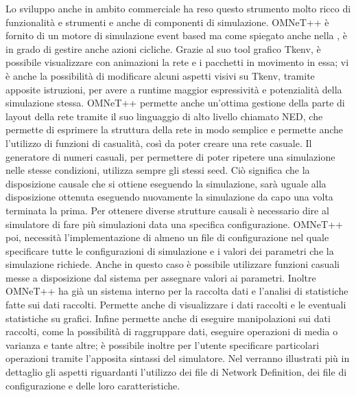 Lo sviluppo anche in ambito commerciale ha reso questo strumento molto ricco di funzionalità e strumenti e anche di componenti di simulazione. OMNeT++ è fornito di un motore di simulazione event based ma come spiegato anche nella , è in grado di gestire anche azioni cicliche. Grazie al suo tool grafico Tkenv, è possibile visualizzare con animazioni la rete e i pacchetti in movimento in essa; vi è anche la possibilità di modificare alcuni aspetti visivi su Tkenv, tramite apposite istruzioni, per avere a runtime maggior espressività e potenzialità della simulazione stessa. OMNeT++ permette anche un'ottima gestione della parte di layout della rete tramite il suo linguaggio di alto livello chiamato \acf{NED}, che permette di esprimere la struttura della rete in modo semplice e permette anche l'utilizzo di funzioni di casualità, così da poter creare una rete casuale. Il generatore di numeri casuali, per permettere di poter ripetere una simulazione nelle stesse condizioni, utilizza sempre gli stessi seed. Ciò significa che la disposizione causale che si ottiene eseguendo la simulazione, sarà uguale alla disposizione ottenuta eseguendo nuovamente la simulazione da capo una volta terminata la prima. Per ottenere diverse strutture causali è necessario dire al simulatore di fare più simulazioni data una specifica configurazione. OMNeT++ poi, necessità l'implementazione di almeno un file di configurazione nel quale specificare tutte le configurazioni di simulazione e i valori dei parametri che la simulazione richiede. Anche in questo caso è possibile utilizzare funzioni casuali messe a disposizione dal sistema per assegnare valori ai parametri. Inoltre OMNeT++ ha già un sistema interno per la raccolta dati e l'analisi di statistiche fatte sui dati raccolti. Permette anche di visualizzare i dati raccolti e le eventuali statistiche su grafici. Infine permette anche di eseguire manipolazioni sui dati raccolti, come la possibilità di raggruppare dati, eseguire operazioni di media o varianza e tante altre; è possibile inoltre per l'utente specificare particolari operazioni tramite l'apposita sintassi del simulatore. Nel  verranno illustrati più in dettaglio gli aspetti riguardanti l'utilizzo dei file di Network Definition, dei file di configurazione e delle loro caratteristiche.